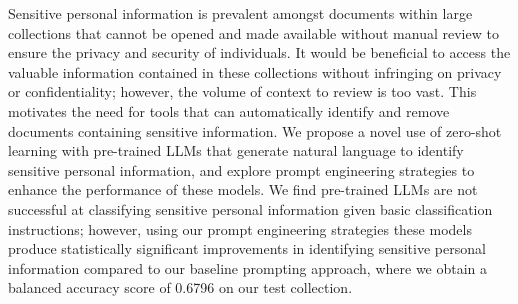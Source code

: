 Sensitive personal information is prevalent amongst documents within large collections that cannot be opened and made available without manual review to ensure the privacy and security of individuals. It would be beneficial to access the valuable information contained in these collections without infringing on privacy or confidentiality; however, the volume of context to review is too vast. This motivates the need for tools that can automatically identify and remove documents containing sensitive information. We propose a novel use of zero-shot learning with pre-trained LLMs that generate natural language to identify sensitive personal information, and explore prompt engineering strategies to enhance the performance of these models. We find pre-trained LLMs are not successful at classifying sensitive personal information given basic classification instructions; however, using our prompt engineering strategies these models produce statistically significant improvements in identifying sensitive personal information compared to our baseline prompting approach, where we obtain a balanced accuracy score of 0.6796 on our test collection.

